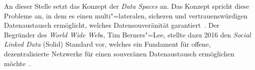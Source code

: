 An dieser Stelle setzt das Konzept der \emph{Data Spaces} an. Das Konzept spricht diese Probleme an, in dem es einen multi"=lateralen, sicheren und vertrauenswürdigen Datenaustausch ermöglicht, welches Datensouveränität garantiert~\cite{mollerIndustrialDataEcosystems2024}.
Der Begründer des \emph{World Wide Web}s, Tim Berners"=Lee, stellte dazu 2016 den \emph{Social Linked Data} (Solid) Standard vor, welches ein Fundament für offene, dezentralisierte Netzwerke für einen souveränen Datenaustausch ermöglichen möchte~\cite{mecklerWebLinkedData2023}.

